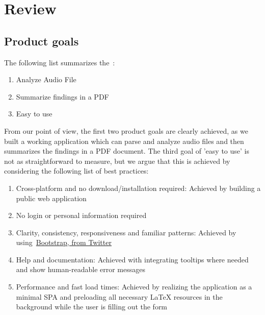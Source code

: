 \section{Review}\label{sec:review}

\subsection{Product goals}\label{subsec:product-goals-review}
The following list summarizes the~:

\begin{enumerate}
    \item Analyze Audio File
    \item Summarize findings in a PDF
    \item Easy to use
\end{enumerate}

From our point of view, the first two product goals are clearly achieved, as we built a working application
which can parse and analyze audio files and then summarizes the findings in a PDF document.
The third goal of 'easy to use' is not as straightforward to measure, but we argue that this is achieved by considering the following
list of best practices:

\begin{enumerate}
    \item Cross-platform and no download/installation required: Achieved by building a public web application
    \item No login or personal information required
    \item Clarity, consistency, responsiveness and familiar patterns: Achieved by using~\href{https://getbootstrap.com/2.0.2/}{Bootstrap, from Twitter}
    \item Help and documentation: Achieved with integrating tooltips where needed and show human-readable error messages
    \item Performance and fast load times: Achieved by realizing the application as a minimal SPA and preloading all necessary LaTeX resources in the background while the user is filling out the form
\end{enumerate}

